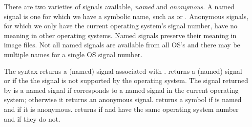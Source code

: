 There are two varieties of signals available, {\em named} and {\em anonymous}.
A named signal is one for which we have a symbolic name, such as 
 or .  
Anonymous signals, for which we only have the current operating system's
 signal number, have no meaning in other operating systems.
Named signals preserve their meaning in image files.
Not all named signals are available from all OS's and
 there may be multiple names for a single OS signal number.

\begin{protos}
\end{protos}
\noindent
The syntax  returns a (named) signal associated with
.
 returns a (named) signal or  if the
 the signal  is not supported by the operating system.
The signal returned by  is a named signal if
  corresponds to a named signal in the current operating
 system; otherwise it returns an anonymous signal.
 returns a symbol if  is named and
  if it is anonymous. 
 returns  if  and 
 have the same operating system number and  if they do not.

